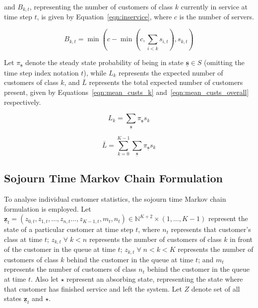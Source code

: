 \documentclass{article}
\begin{document}
and $B_{k,t}$, representing the number of customers of class $k$ currently in
service at time step $t$, is given by Equation~\ref{eqn:inservice}, where $c$
is the number of servers.

\begin{equation}\label{eqn:inservice}
B_{k,t} =\min\left(c - \min\left(c, \sum_{i < k} s_{i,t}\right), s_{k,t}\right)
\end{equation}

Let $\pi_{\underline{\mathbf{s}}}$ denote the steady state probability of being
in state $\underline{\mathbf{s}} \in S$ (omitting the time step index notation
$t$), while $L_k$ represents the expected number of customers of class $k$, and
$\bar{L}$ represents the total expected number of customers present, given by
Equations~\ref{eqn:mean_custs_k} and~\ref{eqn:mean_custs_overall} respectively.

\begin{equation}\label{eqn:mean_custs_k}
L_k = \sum_{\underline{\mathbf{s}}} \pi_{\underline{\mathbf{s}}} s_k
\end{equation}

\begin{equation}\label{eqn:mean_custs_overall}
\bar{L} = \sum_{k = 0}^{K - 1} \sum_{\underline{\mathbf{s}}} \pi_{\underline{\mathbf{s}}} s_k
\end{equation}



\subsection{Sojourn Time Markov Chain Formulation}\label{sec:sojourn_formulation}
To analyse individual customer statistics, the sojourn time Markov chain
formulation is employed. Let
$\underline{\mathbf{z}}_t = (z_{0,t}, z_{1,t}, \dots, z_{n,t} \dots, z_{K-1,t}, m_t, n_t) \in \mathbb{N}^{K+2} \times (1, \dots, K - 1)$
represent the state of a particular customer at time step $t$, where $n_t$
represents that customer's class at time $t$; $z_{k,t} \; \forall \; k < n$
represents the number of customers of class $k$ in front of the customer in the
queue at time $t$; $z_{k,t} \; \forall \; n < k < K$ represents the number of
customers of class $k$ behind the customer in the queue at time $t$; and $m_t$
represents the number of customers of class $n_t$ behind the customer in the
queue at time $t$.
Also let $\star$ represent an absorbing state, representing the state where that
customer has finished service and left the system.
Let $Z$ denote set of all states $\underline{\mathbf{z}}_t$ and $\star$. 
\end{document}
